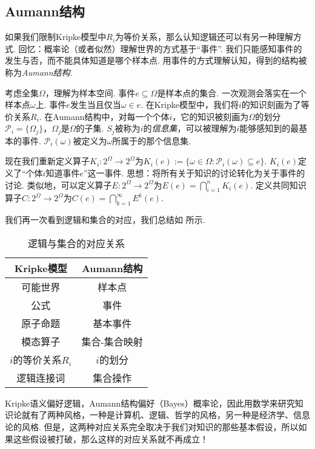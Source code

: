 \subsection{Aumann结构}

如果我们限制Kripke模型中$R_i$为等价关系，那么认知逻辑还可以有另一种理解方式. 回忆：概率论（或者似然）理解世界的方式基于“事件”. 我们只能感知事件的发生与否，而不能具体知道是哪个样本点. 用事件的方式理解认知，得到的结构被称为\emph{Aumann结构}.

考虑全集$\Omega$，理解为样本空间. 事件$e\subseteq \Omega$是样本点的集合. 一次观测会落实在一个样本点$\omega$上. 事件$e$发生当且仅当$\omega\in e$. 在Kripke模型中，我们将$i$的知识刻画为了等价关系$R_i$. 在Aumann结构中，对每一个个体$i$，它的知识被刻画为$\Omega$的划分$\mathcal P_i=\{\Omega_j\}$，$\Omega_j$是$\Omega$的子集. $S_j$被称为$i$的\emph{信息集}，可以被理解为$i$能够感知到的最基本的事件. $\mathcal P_i(\omega)$被定义为$\omega$所属于的那个信息集. 

现在我们重新定义算子$K_i:2^\Omega\to 2^\Omega$为$K_i(e):=\{\omega\in\Omega:\mathcal P_i(\omega)\subseteq e\}$. $K_i(e)$定义了“个体$i$知道事件$e$”这一事件. 思想：将所有关于知识的讨论转化为关于事件的讨论. 类似地，可以定义算子$E:2^\Omega\to 2^\Omega$为$E(e)=\bigcap_{i=1}^n K_i(e)$. 定义共同知识算子$C:2^\Omega\to 2^\Omega$为$C(e)=\bigcap_{k=1}^\infty E^k(e)$.

我们再一次看到逻辑和集合的对应，我们总结如 所示.
\begin{table}[ht]
    \centering
    \begin{tabular}{cc}
    \toprule
            Kripke模型&Aumann结构  \\\midrule
            可能世界&样本点\\
            公式&事件\\
            原子命题&基本事件\\
            模态算子&集合-集合映射\\
            $i$的等价关系$R_i$&$i$的划分\\
            逻辑连接词&集合操作\\\bottomrule
    \end{tabular}
    \caption{逻辑与集合的对应关系}
    \label{tab:logic-set-correspondence}
\end{table}

Kripke语义偏好逻辑，Aumann结构偏好（Bayes）概率论，因此用数学来研究知识论就有了两种风格，一种是计算机、逻辑、哲学的风格，另一种是经济学、信息论的风格. 但是，这两种对应关系完全取决于我们对知识的那些基本假设，所以如果这些假设被打破，那么这样的对应关系就不再成立！

